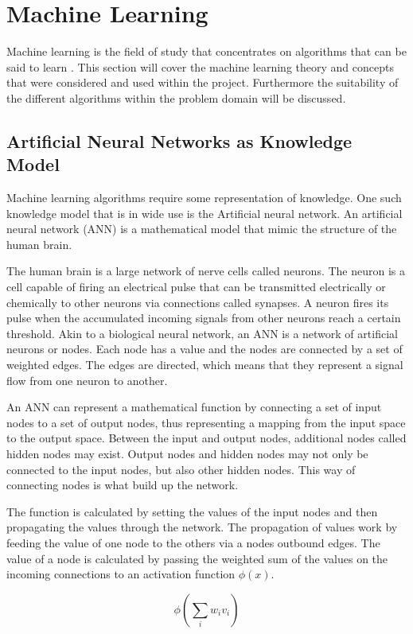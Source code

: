 \section{Machine Learning}
Machine learning is the field of study that concentrates on algorithms that can be said to learn \cite{glossary}. This section will cover the machine learning theory and concepts that were considered and used within the project. Furthermore the suitability of the different algorithms within the problem domain will be discussed.  

\subsection{Artificial Neural Networks as Knowledge Model}
Machine learning algorithms require some representation of knowledge. One such knowledge model that is in wide use is the Artificial neural network. An artificial neural network (ANN) is a mathematical model that mimic the structure of the human brain. 

The human brain is a large network of nerve cells called neurons. The neuron is a cell capable of firing an electrical pulse that can be transmitted electrically or chemically to other neurons via connections called synapses. A neuron fires its pulse when the accumulated incoming signals from other neurons reach a certain threshold. Akin to a biological neural network, an ANN is a network of artificial neurons or nodes. Each node has a value and the nodes are connected by a set of weighted edges. The edges are directed, which means that they represent a signal flow from one neuron to another.

An ANN can represent a mathematical function by connecting a set of input nodes to a set of output nodes, thus representing a mapping from the input space to the output space. Between the input and output nodes, additional nodes called hidden nodes may exist. Output nodes and hidden nodes may not only be connected to the input nodes, but also other hidden nodes. This way of connecting nodes is what build up the network.

The function is calculated by setting the values of the input nodes and then propagating the values through the network. The propagation of values work by feeding the value of one node to the others via a nodes outbound edges. The value of a node is calculated by passing the weighted sum of the values on the incoming connections to an activation function $\phi(x)$.

\begin{equation}
    \phi (\sum_i{w_i v_i})
\end{equation}

